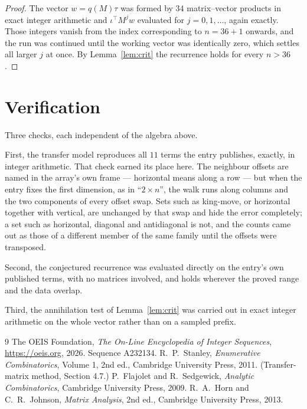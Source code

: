 \documentclass[11pt,a4paper]{article}
\theoremstyle{plain}
\theoremstyle{definition}
\begin{document}
\begin{proof}
The vector $w=q(M)\tau$ was formed by $34$ matrix--vector products in exact integer
arithmetic and $\iota^{\!\top}M^{j}w$ evaluated for $j=0,1,\dots$, again exactly. Those
integers vanish from the index corresponding to $n=36+1$ onwards, and the run was
continued until the working vector was identically zero, which settles all larger $j$ at once.
By Lemma~\ref{lem:crit} the recurrence holds for every $n>36$.
\end{proof}

\section{Verification}

Three checks, each independent of the algebra above.

First, the transfer model reproduces all $11$ terms the entry publishes, exactly, in
integer arithmetic. That check earned its place here. The neighbour offsets are named in the
array's own frame --- horizontal means along a row --- but when the entry fixes the first
dimension, as in ``$2\times n$'', the walk runs along columns and the two components of every
offset swap. Sets such as king-move, or horizontal together with vertical, are unchanged by
that swap and hide the error completely; a set such as horizontal, diagonal and antidiagonal
is not, and the counts came out as those of a different member of the same family until the
offsets were transposed.

Second, the conjectured recurrence was evaluated directly on the entry's own published terms,
with no matrices involved, and holds wherever the proved range and the data overlap.

Third, the annihilation test of Lemma~\ref{lem:crit} was carried out in exact integer
arithmetic on the whole vector rather than on a sampled prefix.

\begin{thebibliography}{9}
 The OEIS Foundation, \emph{The On-Line Encyclopedia of Integer
Sequences}, \url{https://oeis.org}, 2026. Sequence A232134.
 R.~P.~Stanley, \emph{Enumerative Combinatorics}, Volume 1, 2nd ed.,
Cambridge University Press, 2011. (Transfer-matrix method, Section 4.7.)
 P.~Flajolet and R.~Sedgewick, \emph{Analytic Combinatorics}, Cambridge
University Press, 2009.
 R.~A.~Horn and C.~R.~Johnson, \emph{Matrix Analysis}, 2nd ed., Cambridge
University Press, 2013.
\end{thebibliography}
\end{document}
